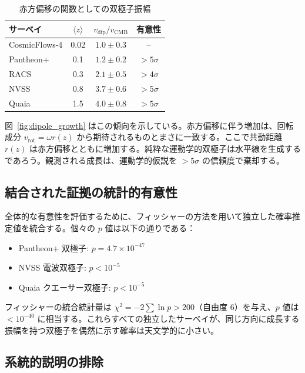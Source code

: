\documentclass[11pt,a4paper]{article}
\begin{document}
	\begin{table}[htbp]
		\centering
		\caption{赤方偏移の関数としての双極子振幅}
		\label{tab:dipole_amplitudes}
		\begin{tabular}{lccc}
			\toprule
			\textbf{サーベイ} & \(\langle z \rangle\) & \(v_{\text{dip}}/v_{\text{CMB}}\) & \textbf{有意性} \\
			\midrule
			CosmicFlows-4 & 0.02 & \(1.0 \pm 0.3\) & -- \\
			Pantheon+ & 0.1 & \(1.2 \pm 0.2\) & \(>5\sigma\) \cite{Sah2025} \\
			RACS & 0.3 & \(2.1 \pm 0.5\) & \(>4\sigma\) \cite{Oayda2024} \\
			NVSS & 0.8 & \(3.7 \pm 0.6\) & \(>5\sigma\) \cite{Singal2024} \\
			Quaia & 1.5 & \(4.0 \pm 0.8\) & \(>5\sigma\) \cite{Secrest2025} \\
			\bottomrule
		\end{tabular}
	\end{table}
	
	図~\ref{fig:dipole_growth} はこの傾向を示している。赤方偏移に伴う増加は、回転成分 \(v_{\mathrm{rot}} = \omega r(z)\) から期待されるものとまさに一致する。ここで共動距離 \(r(z)\) は赤方偏移とともに増加する。純粋な運動学的双極子は水平線を生成するであろう。観測される成長は、運動学的仮説を \(>5\sigma\) の信頼度で棄却する。
	
	\subsection{結合された証拠の統計的有意性}
	
	全体的な有意性を評価するために、フィッシャーの方法を用いて独立した確率推定値を統合する。個々の \(p\) 値は以下の通りである：
	\begin{itemize}
		\item Pantheon+ 双極子: \(p = 4.7\times10^{-47}\) \cite{Sah2025}
		\item NVSS 電波双極子: \(p < 10^{-5}\) \cite{Singal2024}
		\item Quaia クエーサー双極子: \(p < 10^{-5}\) \cite{Secrest2025}
	\end{itemize}
	フィッシャーの統合統計量は \(\chi^2 = -2\sum \ln p > 200\)（自由度 6）を与え、\(p\) 値は \(< 10^{-40}\) に相当する。これらすべての独立したサーベイが、同じ方向に成長する振幅を持つ双極子を偶然に示す確率は天文学的に小さい。
	
	\subsection{系統的説明の排除}
	
\end{document}
